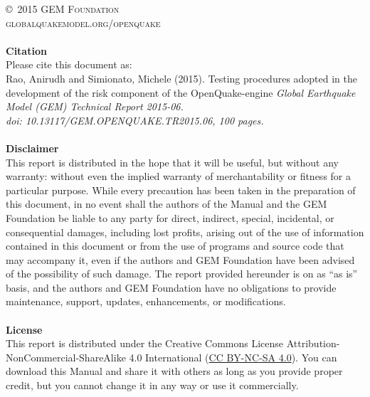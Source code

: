 \documentclass[11pt,fleqn]{book} %
\begin{document}
\noindent \copyright\ \textsc{2015 GEM Foundation}\\ %
\noindent \textsc{globalquakemodel.org/openquake}\\ %
\noindent \hfill\\
\noindent
   {\textbf{Citation}} \hfill \\
   Please cite this document as: \hfill \\
   Rao, Anirudh and Simionato, Michele (2015). 
   Testing procedures adopted in the development of the risk 
   component of the OpenQuake-engine 
   \textit{Global Earthquake Model (GEM) Technical Report 2015-06.\\ 
   doi: 10.13117/GEM.OPENQUAKE.TR2015.06, 100 pages.} \hfill \\
\noindent \hfill\\
\noindent
   {\bf{Disclaimer}} \hfill \\
   This report is distributed in the hope that it will be 
   useful, but without any warranty: without even the implied warranty of 
   merchantability or fitness for a particular purpose. While every precaution 
   has been taken in the preparation of this document, in no event shall the 
   authors of the Manual and the GEM Foundation be liable to any party for 
   direct, indirect, special, incidental, or consequential damages, including 
   lost profits, arising out of the use of information contained in this 
   document or from the use of programs and source code that may accompany it, 
   even if the authors and GEM Foundation have been advised of the possibility 
   of such damage. The report provided hereunder is on as ``as is'' basis, and the 
   authors and GEM Foundation have no obligations to provide maintenance, 
   support, updates, enhancements, or modifications. \hfill \\
\noindent \hfill\\
\noindent
   {\bf{License}} \hfill \\
   This report is distributed under the Creative Commons License 
   Attribution-NonCommercial-ShareAlike 4.0 International 
   (\href{http://creativecommons.org/licenses/by-nc-sa/4.0/}
   {CC BY-NC-SA 4.0}). 
   You can download this Manual and share it with 
   others as long as you provide proper credit, but you cannot change 
   it in any way or use it commercially.\hfill \\
\end{document}
